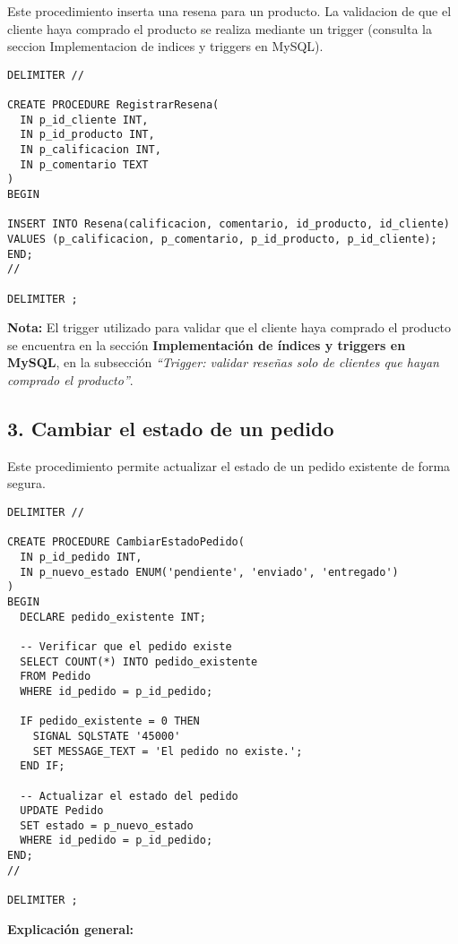 Este procedimiento inserta una resena para un producto. La validacion de que el cliente haya comprado el producto se realiza mediante un trigger (consulta la seccion Implementacion de indices y triggers en MySQL).

\begin{lstlisting}
DELIMITER //

CREATE PROCEDURE RegistrarResena(
  IN p_id_cliente INT,
  IN p_id_producto INT,
  IN p_calificacion INT,
  IN p_comentario TEXT
)
BEGIN
 
INSERT INTO Resena(calificacion, comentario, id_producto, id_cliente)
VALUES (p_calificacion, p_comentario, p_id_producto, p_id_cliente);
END;
//

DELIMITER ;
\end{lstlisting}

\textbf{Nota:} El trigger utilizado para validar que el cliente haya comprado el producto se encuentra en la secci\'on \textbf{Implementaci\'on de \'indices y triggers en MySQL}, en la subsecci\'on \emph{``Trigger: validar rese\~nas solo de clientes que hayan comprado el producto''}.

\subsection{3. Cambiar el estado de un pedido}

Este procedimiento permite actualizar el estado de un pedido existente de forma segura.

\begin{lstlisting}
DELIMITER //

CREATE PROCEDURE CambiarEstadoPedido(
  IN p_id_pedido INT,
  IN p_nuevo_estado ENUM('pendiente', 'enviado', 'entregado')
)
BEGIN
  DECLARE pedido_existente INT;

  -- Verificar que el pedido existe
  SELECT COUNT(*) INTO pedido_existente
  FROM Pedido
  WHERE id_pedido = p_id_pedido;

  IF pedido_existente = 0 THEN
    SIGNAL SQLSTATE '45000'
    SET MESSAGE_TEXT = 'El pedido no existe.';
  END IF;

  -- Actualizar el estado del pedido
  UPDATE Pedido
  SET estado = p_nuevo_estado
  WHERE id_pedido = p_id_pedido;
END;
//

DELIMITER ;
\end{lstlisting}

\textbf{Explicación general:}

